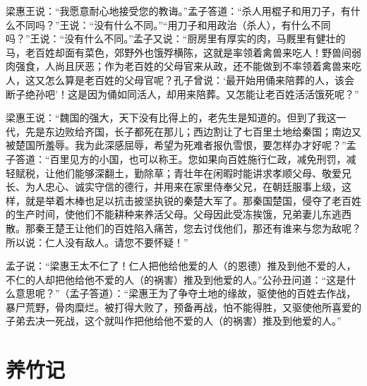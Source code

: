 \documentclass[12pt,UTF-8,openany,a4]{ctexbook}
\begin{document}
\begin{large}
    梁惠王说：“我愿意耐心地接受您的教诲。”孟子答道：“杀人用棍子和用刀子，有什么不同吗？”王说：“没有什么不同。”“用刀子和用政治（杀人），有什么不同吗？”王说：“没有什么不同。”孟子又说：“厨房里有厚实的肉，马厩里有健壮的马，老百姓却面有菜色，郊野外也饿殍横陈，这就是率领着禽兽来吃人！野兽间弱肉强食，人尚且厌恶；作为老百姓的父母官来从政，还不能做到不率领着禽兽来吃人，这又怎么算是老百姓的父母官呢？孔子曾说：‘最开始用俑来陪葬的人，该会断子绝孙吧’！这是因为俑如同活人，却用来陪葬。又怎能让老百姓活活饿死呢？”
    
    梁惠王说：“魏国的强大，天下没有比得上的，老先生是知道的。但到了我这一代，先是东边败给齐国，长子都死在那儿；西边割让了七百里土地给秦国；南边又被楚国所羞辱。我为此深感屈辱，希望为死难者报仇雪恨，要怎样办才好呢？”孟子答道：“百里见方的小国，也可以称王。您如果向百姓施行仁政，减免刑罚，减轻赋税，让他们能够深翻土，勤除草；青壮年在闲暇时能讲求孝顺父母、敬爱兄长、为人忠心、诚实守信的德行，并用来在家里侍奉父兄，在朝廷服事上级，这样，就是举着木棒也足以抗击披坚执锐的秦楚大军了。那秦国楚国，侵夺了老百姓的生产时间，使他们不能耕种来养活父母。父母因此受冻挨饿，兄弟妻儿东逃西散。那秦王楚王让他们的百姓陷入痛苦，您去讨伐他们，那还有谁来与您为敌呢？所以说：仁人没有敌人。请您不要怀疑！”
    
    孟子说：“梁惠王太不仁了！仁人把他给他爱的人（的恩德）推及到他不爱的人，不仁的人却把他给他不爱的人（的祸害）推及到他爱的人。”公孙丑问道：“这是什么意思呢？”（孟子答道）：“梁惠王为了争夺土地的缘故，驱使他的百姓去作战，暴尸荒野，骨肉糜烂。被打得大败了，预备再战，怕不能得胜，又驱使他所喜爱的子弟去决一死战，这个就叫作把他给他不爱的人（的祸害）推及到他爱的人。”
    
\end{large}


\chapter{养竹记}
\end{document}
